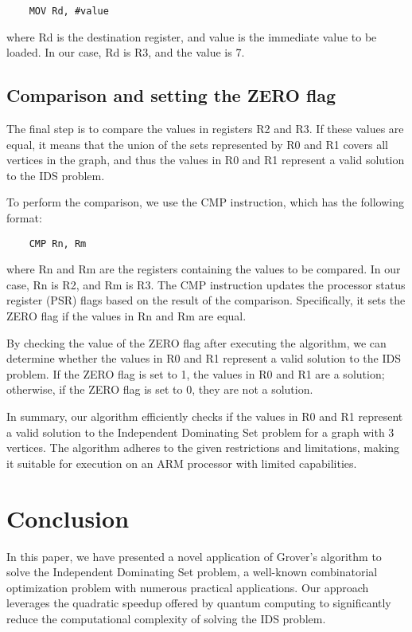 \begin{verbatim}
    MOV Rd, #value
\end{verbatim}

where Rd is the destination register, and value is the immediate value to be loaded. In our case, Rd is R3, and the value is 7.

\subsection{Comparison and setting the ZERO flag}

The final step is to compare the values in registers R2 and R3. If these values are equal, it means that the union of the sets represented by R0 and R1 covers all vertices in the graph, and thus the values in R0 and R1 represent a valid solution to the IDS problem.

To perform the comparison, we use the CMP instruction, which has the following format:

\begin{verbatim}
    CMP Rn, Rm
\end{verbatim}

where Rn and Rm are the registers containing the values to be compared. In our case, Rn is R2, and Rm is R3. The CMP instruction updates the processor status register (PSR) flags based on the result of the comparison. Specifically, it sets the ZERO flag if the values in Rn and Rm are equal.

By checking the value of the ZERO flag after executing the algorithm, we can determine whether the values in R0 and R1 represent a valid solution to the IDS problem. If the ZERO flag is set to 1, the values in R0 and R1 are a solution; otherwise, if the ZERO flag is set to 0, they are not a solution.

In summary, our algorithm efficiently checks if the values in R0 and R1 represent a valid solution to the Independent Dominating Set problem for a graph with 3 vertices. The algorithm adheres to the given restrictions and limitations, making it suitable for execution on an ARM processor with limited capabilities.

\section{Conclusion}
\label{sec:conclusion}

In this paper, we have presented a novel application of Grover's algorithm to solve the Independent Dominating Set problem, a well-known combinatorial optimization problem with numerous practical applications. Our approach leverages the quadratic speedup offered by quantum computing to significantly reduce the computational complexity of solving the IDS problem.

